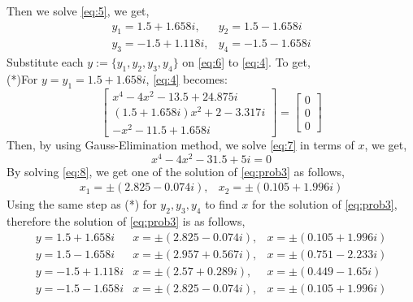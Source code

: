 \documentclass[a4paper,12pt]{article}
\theoremstyle{definition}
\begin{document}
Then we solve \eqref{eq:5}, we get,
\begin{equation}\label{eq:6}
\begin{array}{cc}
y_1 = 1.5 + 1.658i, & y_2 = 1.5 - 1.658i\\
y_3 = -1.5 + 1.118i, & y_4 = -1.5 - 1.658i
\end{array}
\end{equation}
Substitute each $y:=\{y_1,y_2,y_3,y_4\}$ on \eqref{eq:6} to \eqref{eq:4}. To get,\\
(*)For $y = y_1 = 1.5 + 1.658i$, \eqref{eq:4} becomes:
\begin{equation}\label{eq:7}
\left[ \begin{array}{l}
x^4-4x^2-13.5+24.875i\\
(1.5 + 1.658i)x^2+2-3.317i\\
-x^2 -11.5 + 1.658i
\end{array}\right] = \left[ \begin{array}{c}
0\\
0\\
0
\end{array}\right]
\end{equation}
Then, by using Gauss-Elimination method, we solve \eqref{eq:7} in terms of $x$, we get,
\begin{equation}\label{eq:8}
x^4 -4x^2-31.5+5i = 0
\end{equation}
By solving \eqref{eq:8}, we get one of the solution of \eqref{eq:prob3} as follows,
\begin{equation}
\begin{array}{cc}
x_1 = \pm (2.825 - 0.074i), & x_2 = \pm (0.105 + 1.996i)
\end{array}
\end{equation}
Using the same step as (*) for $y_2,y_3,y_4$ to find $x$ for the solution of \eqref{eq:prob3}, therefore the solution of \eqref{eq:prob3} is as follows,
\begin{equation}
\begin{array}{ccc}
y = 1.5 + 1.658i & x = \pm (2.825 - 0.074i), & x = \pm (0.105 + 1.996i)\\
y = 1.5 - 1.658i & x = \pm (2.957 + 0.567i), & x = \pm (0.751 - 2.233i)\\
y = -1.5 + 1.118i & x = \pm (2.57 + 0.289i), & x = \pm (0.449 - 1.65i)\\
y = -1.5 - 1.658i & x = \pm (2.825 - 0.074i), & x = \pm (0.105 + 1.996i)
\end{array}
\end{equation}
\end{document}
